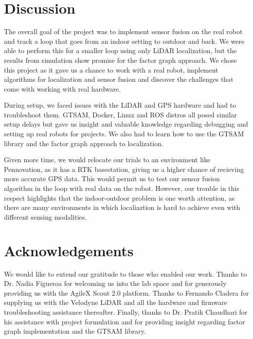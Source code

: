 \documentclass[10pt, reqno, letterpaper, twoside]{amsart}
\begin{document}
\section{Discussion}
The overall goal of the project was to implement sensor fusion on the real robot and track a loop that goes from an indoor setting to outdoor and back. We were able to perform this for a smaller loop using only LiDAR localization, but the results from simulation show promise for the factor graph approach.
We chose this project as it gave us a chance to work with a real robot, implement algorithms for localization and sensor fusion and discover the challenges that come with working with real hardware. 

During setup, we faced issues with the LiDAR and GPS hardware and had to troubleshoot them. GTSAM, Docker, Linux and ROS distros all posed similar setup delays but gave us insight and valuable knowledge regarding debugging and setting up real robots for projects. We also had to learn how to use the GTSAM library and the factor graph approach to localization. 

Given more time, we would relocate our trials to an environment like Pennovation, as it has a RTK basestation, giving us a higher chance of recieving more accurate GPS data. This would permit us to test our sensor fusion algorithm in the loop with real data on the robot. However, our trouble in this respect highlights that the indoor-outdoor problem is one worth attention, as there are many environments in which localiaztion is hard to achieve even with different sensing modalities.
\section{Acknowledgements}

We would like to extend our gratitude to those who enabled our work. Thanks to Dr. Nadia Figueroa for welcoming us into the lab space and for generously providing us with the AgileX Scout 2.0 platform. Thanks to Fernando Cladera for supplying us with the Velodyne LiDAR and all the hardware and firmware troubleshooting assistance thereafter. Finally, thanks to Dr. Pratik Chaudhari for his assistance with project formulation and for providing insight regarding factor graph implementation and the GTSAM library.
\clearpage


\end{document}
